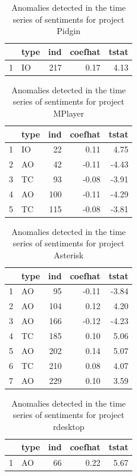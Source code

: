 \documentclass[12pt]{report}
\begin{document}
\begin{table}
\centering
\caption{Anomalies detected in the time series of sentiments for project Pidgin}
\begin{tabular}{rlrrr}
  \hline
 & type & ind & coefhat & tstat \\ 
  \hline
1 & IO & 217 & 0.17 & 4.13 \\ 
   \hline
\end{tabular}
\end{table}



\begin{table}
\centering
\caption{Anomalies detected in the time series of sentiments for project MPlayer}
\begin{tabular}{rlrrr}
  \hline
 & type & ind & coefhat & tstat \\ 
  \hline
1 & IO &  22 & 0.11 & 4.75 \\ 
  2 & AO &  42 & -0.11 & -4.43 \\ 
  3 & TC &  93 & -0.08 & -3.91 \\ 
  4 & AO & 100 & -0.11 & -4.29 \\ 
  5 & TC & 115 & -0.08 & -3.81 \\ 
   \hline
\end{tabular}
\end{table}


\begin{table}
\centering
\caption{Anomalies detected in the time series of sentiments for project Asterisk}
\begin{tabular}{rlrrr}
  \hline
 & type & ind & coefhat & tstat \\ 
  \hline
1 & AO &  95 & -0.11 & -3.84 \\ 
  2 & AO & 104 & 0.12 & 4.20 \\ 
  3 & AO & 166 & -0.12 & -4.23 \\ 
  4 & TC & 185 & 0.10 & 5.06 \\ 
  5 & AO & 202 & 0.14 & 5.07 \\ 
  6 & TC & 210 & 0.08 & 4.07 \\ 
  7 & AO & 229 & 0.10 & 3.59 \\ 
   \hline
\end{tabular}
\end{table}


\begin{table}
\centering
\caption{Anomalies detected in the time series of sentiments for project rdesktop}
\begin{tabular}{rlrrr}
  \hline
 & type & ind & coefhat & tstat \\ 
  \hline
1 & AO &  66 & 0.22 & 5.67 \\ 
   \hline
\end{tabular}
\end{table}
\end{document}

